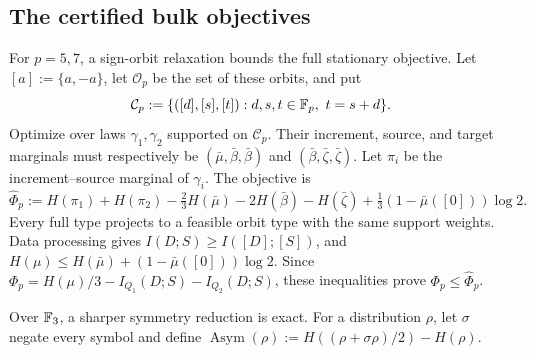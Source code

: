 \subsection{The certified bulk objectives}

For $p=5,7$, a sign-orbit relaxation bounds the full stationary objective.
Let $[a]:=\{a,-a\}$, let $\mathcal O_p$ be the set of these orbits,
and put
\[
 \mathcal C_p:=\{([d],[s],[t]):d,s,t\in\F_p,\ t=s+d\}.
\]
Optimize over laws $\gamma_1,\gamma_2$ supported on $\mathcal C_p$.
Their increment, source, and target marginals must respectively be
$(\bar\mu,\bar\beta,\bar\beta)$ and
$(\bar\beta,\bar\zeta,\bar\zeta)$.
Let $\pi_i$ be the increment--source marginal of $\gamma_i$. The objective is
\begin{equation}\label{eq:baa-orbit-objective}
 \widehat\Phi_p:=H(\pi_1)+H(\pi_2)-\tfrac23H(\bar\mu)
              -2H(\bar\beta)-H(\bar\zeta)
              +\tfrac13(1-\bar\mu([0]))\log2.
\end{equation}
Every full type projects to a feasible orbit type with the same support
weights. Data processing gives $I(D;S)\ge I([D];[S])$, and
$H(\mu)\le H(\bar\mu)+(1-\bar\mu([0]))\log2$.
Since $\Phi_p=H(\mu)/3-I_{Q_1}(D;S)-I_{Q_2}(D;S)$, these inequalities
prove $\Phi_p\le\widehat\Phi_p$.

Over $\mathbb F_3$, a sharper symmetry reduction is exact. For a distribution
$\rho$, let $\sigma$ negate every symbol and define
$\operatorname{Asym}(\rho):=H((\rho+\sigma\rho)/2)-H(\rho)$.

